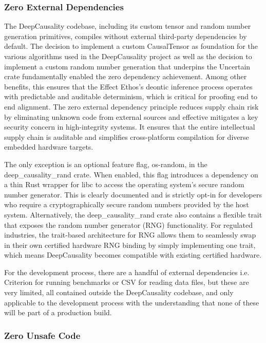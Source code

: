 \newpage

\subsubsection{Zero External Dependencies}

The DeepCausality codebase, including its custom tensor and random number generation primitives, compiles without external third-party dependencies by default. The decision to implement a custom CausalTensor as foundation for the various algorithms used in the DeepCausality project as well as the decision to implement a custom random number generation that underpins the Uncertain crate fundamentally enabled the zero dependency achievement. Among other benefits, this ensures that the Effect Ethos's deontic inference process operates with predictable and auditable determinism, which is critical for proofing end to end alignment. 
The zero external dependency principle reduces supply chain risk by eliminating unknown code from external sources and effective mitigates a key security concern in high-integrity systems. It ensures that the entire intellectual supply chain is auditable and simplifies cross-platform compilation for diverse embedded hardware targets.


The only exception is an optional feature flag, os-random, in the deep\_causality\_rand crate. When enabled, this flag introduces a dependency on a thin Rust wrapper for libc to access the operating system’s secure random number generator. This is clearly documented and is strictly opt-in for developers who require a cryptographically secure random numbers provided by the host system. Alternatively, the deep\_causality\_rand crate also contains a flexible trait that exposes the random number generator (RNG) functionality. For regulated industries, the trait-based architecture for RNG allows them to seamlessly swap in their own certified hardware RNG binding by simply implementing one trait, which means DeepCausality becomes compatible with  existing certified hardware. 

For the development process, there are a handful of external dependencies i.e. Criterion for running benchmarks or CSV for reading data files, but these are very limited, all contained outside the DeepCausality codebase, and only applicable to the development process with the understanding that none of these will be part of a production build.  

\subsubsection{Zero Unsafe Code}

